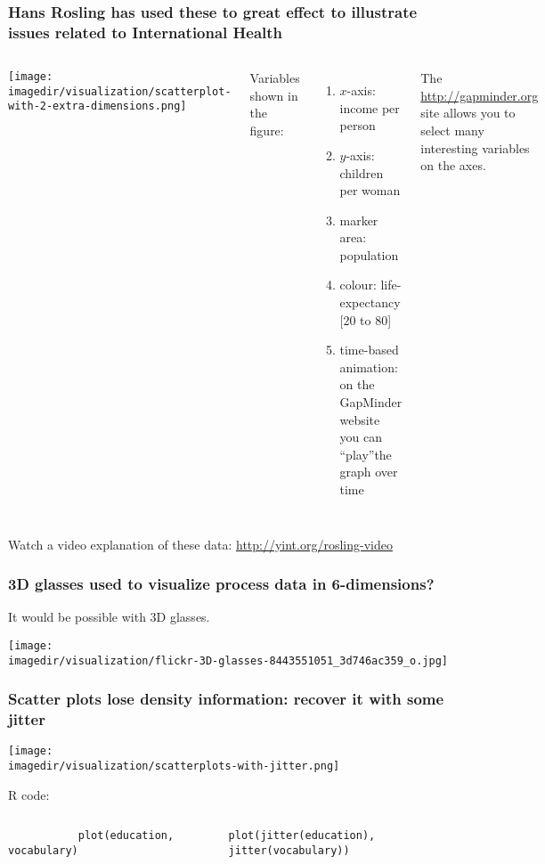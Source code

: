 \begin{frame}\frametitle{Hans Rosling has used these to great effect to illustrate issues related to International Health}
	\begin{columns}[T]
			\centerline{\texttt{[image: \\imagedir/visualization/scatterplot-with-2-extra-dimensions.png]}}
			
			Variables shown in the figure:
			\begin{enumerate}
				\item	$x$-axis: income per person
				\item	$y$-axis: children per woman
				\item	marker area: population
				\item	colour: life-expectancy \scriptsize{[20 to 80]}
				\item	time-based animation: on the GapMinder website you can ``play''the graph over time  
			\end{enumerate}
			The \href{http://gapminder.org}{http://gapminder.org} site allows you to select many interesting variables on the axes.
	\end{columns}
	
	\vspace{10pt}
	Watch a video explanation of these data: \href{http://www.youtube.com/v/jbkSRLYSojo}{http://yint.org/rosling-video} 
\end{frame}

\begin{frame}\frametitle{3D glasses used to visualize process data in 6-dimensions?}
	It would be possible with 3D glasses.
	
	\centerline{\texttt{[image: \\imagedir/visualization/flickr-3D-glasses-8443551051\_3d746ac359\_o.jpg]}}
	
\end{frame}


\begin{frame}\frametitle{Scatter plots lose density information: recover it with some jitter}
	\texttt{[image: \\imagedir/visualization/scatterplots-with-jitter.png]}
	
	\vspace{-12pt}
	R code:
	\begin{columns}[T]
			 {\scriptsize \texttt{~~~~~~~~~~~plot(education, vocabulary)}}
			 
			
			
			{\scriptsize \texttt{plot(jitter(education), jitter(vocabulary))}}
	\end{columns}
	
\end{frame}

